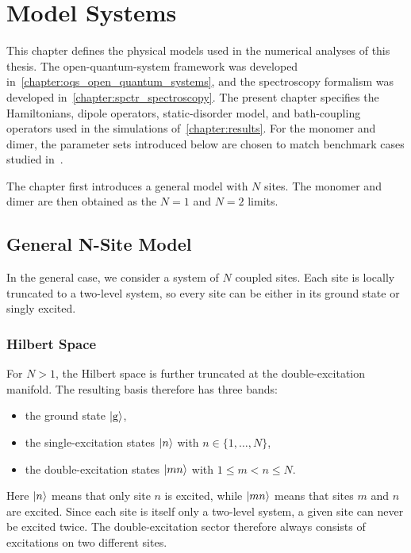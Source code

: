 \chapter{Model Systems}
\label{chapter:model_systems}

This chapter defines the physical models used in the numerical
analyses of this thesis. The open-quantum-system framework was developed
in~\autoref{chapter:oqs_open_quantum_systems}, and the spectroscopy formalism was
developed in~\autoref{chapter:spctr_spectroscopy}. The present chapter
specifies the Hamiltonians, dipole operators, static-disorder model, and
bath-coupling operators used in the simulations of~\autoref{chapter:results}.
For the monomer and dimer, the parameter sets introduced below are chosen to
match benchmark cases studied
in~\cite{mancaletal2006twodimensionalopticalthreepulse,pisliakovetal2006twodimensionalopticalthreepulse}.

The chapter first introduces a general model with \(N\) sites. The
monomer and dimer are then obtained as the \(N=1\) and
\(N=2\) limits.

\section{General N-Site Model}
\label{sec:model_ensemble}

In the general case, we consider a system of \(N\) coupled sites. Each site is
locally truncated to a two-level system, so every site can be either in its
ground state or singly excited.

\subsection{Hilbert Space}

For \(N>1\), the Hilbert space is further truncated at the double-excitation
manifold. The resulting basis therefore has three bands:
\begin{itemize}
\item the ground state \(\ket{\mathrm{g}}\),
\item the single-excitation states \(\ket{n}\) with \(n\in\{1,\dots,N\}\),
\item the double-excitation states \(\ket{mn}\) with \(1\le m<n\le N\).
\end{itemize}
Here \(\ket{n}\) means that only site \(n\) is excited, while \(\ket{mn}\)
means that sites \(m\) and \(n\) are excited. Since each site is itself only a
two-level system, a given site can never be excited twice. The
double-excitation sector therefore always consists of excitations on two
different sites.

